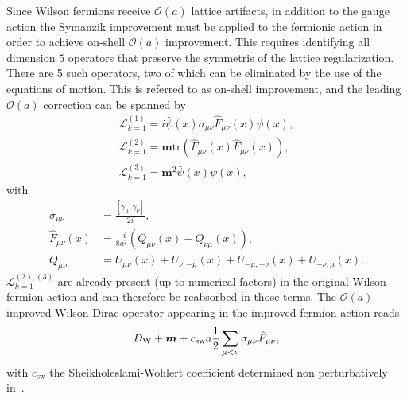 Since Wilson fermions receive $\mathcal{O}(a)$ lattice artifacts, in addition to the gauge action the Symanzik improvement must be applied to the fermionic action in order 
to achieve on-shell $\mathcal{O}(a)$ improvement. This requires identifying all dimension $5$ operators that preserve the symmetris of the lattice regularization. There are 5 such operators, two of which can be eliminated by the use of the equations of motion. This is referred to as on-shell improvement, and the leading $\mathcal{O}(a)$ correction can be spanned by 
\begin{gather}
\label{ch_foundation:eq:L1}
\mathcal{L}_{k=1}^{(1)}=i\bar{\psi}(x)\sigma_{\mu\nu}\hat{F}_{\mu\nu}(x)\psi(x),\\
\mathcal{L}_{k=1}^{(2)}=\boldsymbol{m}{\textrm{tr}}\left(\hat{F}_{\mu\nu}(x)\hat{F}_{\mu\nu}(x)\right),\\
\mathcal{L}_{k=1}^{(3)}=\boldsymbol{m}^2\bar{\psi}(x)\psi(x),
\end{gather}
with
\begin{align}
\label{ch_foundation:eq:dim5-op}
\sigma_{\mu\nu}&=\frac{\left[\gamma_{\mu},\gamma_{\nu}\right]}{2i},\\
\hat{F}_{\mu\nu}(x)&=\frac{-i}{8a^2}\left(Q_{\mu\nu}(x)-Q_{\nu\mu}(x)\right),\\
Q_{\mu\nu}&=U_{\mu\nu}(x)+U_{\nu,-\mu}(x)+U_{-\mu,-\nu}(x)+U_{-\nu,\mu}(x).
\end{align}
$\mathcal{L}_{k=1}^{(2),(3)}$ are already present (up to numerical factors) in the original Wilson fermion action and can therefore be reabsorbed in those terms. The $\mathcal{O}(a)$ improved Wilson Dirac operator appearing in the improved fermion action reads
\begin{equation}
\label{ch_foundation:eq:DW_impr}
D_{\textrm W}+\boldsymbol{m}+c_{\textrm{sw}}a\frac{1}{2}\sum_{\mu<\nu}\sigma_{\mu\nu}\hat{F}_{\mu\nu},
\end{equation}
with $c_{\textrm{sw}}$ the Sheikholeslami-Wohlert coefficient determined non perturbatively in~\citep{Sheikholeslami:1985ij}.

